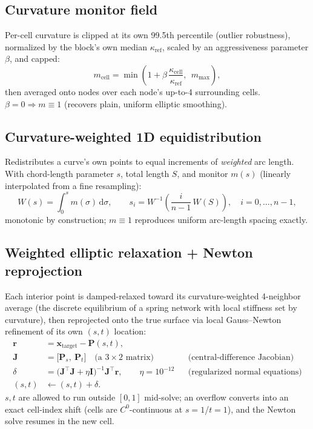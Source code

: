 \documentclass[11pt]{article}
\newcommand{\dd}{\mathrm{d}}
\newcommand{\vecb}[1]{\bm{#1}}
\begin{document}
\subsection{Curvature monitor field}
Per-cell curvature is clipped at its own 99.5th percentile (outlier
robustness), normalized by the block's own median \(\kappa_{\mathrm{ref}}\),
scaled by an aggressiveness parameter \(\beta\), and capped:
\begin{equation}
m_{\text{cell}} = \min\!\left(1 + \beta\,\frac{\kappa_{\text{cell}}}{\kappa_{\mathrm{ref}}},\ \ m_{\max}\right),
\end{equation}
then averaged onto nodes over each node's up-to-4 surrounding cells.
\(\beta=0 \Rightarrow m \equiv 1\) (recovers plain, uniform elliptic
smoothing).

\subsection{Curvature-weighted 1D equidistribution}
\label{sec:equidistribution}
Redistributes a curve's own points to equal increments of
\emph{weighted} arc length. With chord-length parameter \(s\), total
length \(S\), and monitor \(m(s)\) (linearly interpolated from a fine
resampling):
\begin{equation}
W(s) = \int_0^s m(\sigma)\,\dd\sigma, \qquad
s_i = W^{-1}\!\left(\frac{i}{n-1}\,W(S)\right), \quad i=0,\dots,n-1,
\end{equation}
monotonic by construction; \(m\equiv 1\) reproduces uniform arc-length
spacing exactly.

\subsection{Weighted elliptic relaxation + Newton reprojection}
\label{sec:newton-reprojection}
Each interior point is damped-relaxed toward its curvature-weighted
4-neighbor average (the discrete equilibrium of a spring network with
local stiffness set by curvature), then reprojected onto the true
surface via local Gauss--Newton refinement of its own \((s,t)\)
location:
\begin{align}
\vecb{r} &= \vecb{x}_{\text{target}} - \vecb{P}(s,t), \\
\vecb{J} &= \big[\vecb{P}_s,\ \vecb{P}_t\big] \quad\text{(a } 3\times2 \text{ matrix)}
&&\text{(central-difference Jacobian)} \\
\delta &= \big(\vecb{J}^{\!\top}\vecb{J} + \eta \vecb{I}\big)^{-1} \vecb{J}^{\!\top}\vecb{r},
\qquad \eta = 10^{-12}
&&\text{(regularized normal equations)} \\
(s,t) &\leftarrow (s,t) + \delta .
\end{align}
\(s,t\) are allowed to run outside \([0,1]\) mid-solve; an overflow
converts into an exact cell-index shift (cells are \(C^0\)-continuous
at \(s=1\)/\(t=1\)), and the Newton solve resumes in the new cell.
\end{document}
